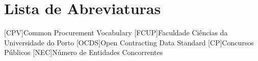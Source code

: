 \chapter*{Lista de Abreviaturas}
\label{chap:abbreviations}

\begin{multicols}{2}[]
	\begin{scriptsize}
        	\begin{acronym}
        		    [CPV]{Common Procurement Vocabulary}
        		    {Faculdade Ciências da Universidade do Porto}
                    [OCDS]{Open Contracting Data Standard}
                    [CP]{Concursos Públicos}
                    [NEC]{Número de Entidades Concorrentes}                    
                    		\end{acronym}
	\end{scriptsize}
\end{multicols}
\clearemptydoublepage
